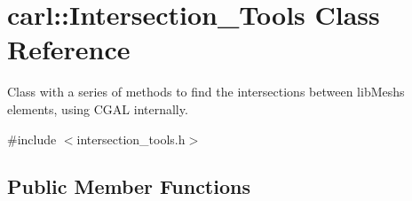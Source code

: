\hypertarget{classcarl_1_1_intersection___tools}{}\section{carl\+:\+:Intersection\+\_\+\+Tools Class Reference}
\label{classcarl_1_1_intersection___tools}


Class with a series of methods to find the intersections between lib\+Mesh\textquotesingle{}s elements, using C\+G\+A\+L internally.  




{\ttfamily \#include $<$intersection\+\_\+tools.\+h$>$}

\subsection*{Public Member Functions}
